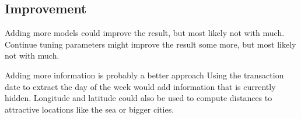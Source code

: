 \documentclass[a4paper]{article}
\begin{document}

\subsection{Improvement}
Adding more models could improve the result, but most likely not with much. Continue tuning parameters might improve the result some more, but most likely not with much.

Adding more information is probably a better approach Using the transaction date to extract the day of the week would add information that is currently hidden. Longitude and latitude could also be used to compute distances to attractive locations like the sea or bigger cities.
\end{document}
